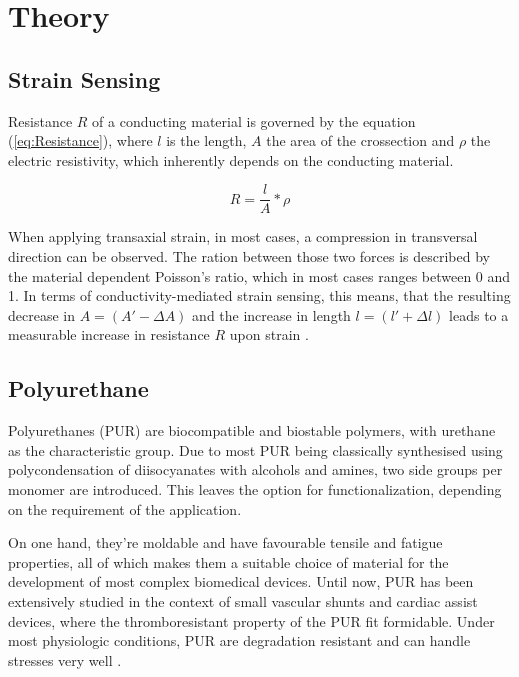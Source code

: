 \section{Theory}
\label{sec:Theory}

\subsection{Strain Sensing}
Resistance $R$ of a conducting material is governed by the equation (\ref{eq:Resistance}), where $l$ is the length, $A$ the area of the crossection and $\rho$ the electric resistivity, which inherently depends on the conducting material.

\begin{equation}
\label{eq:Resistance}
    R = \frac{l}{A}*\rho
\end{equation}

When applying transaxial strain, in most cases, a compression in transversal direction can be observed. The ration between those two forces is described by the material dependent Poisson's ratio, which in most cases ranges between 0 and 1. \cite{Gercek} In terms of conductivity-mediated strain sensing, this means, that the resulting decrease in $A = (A' -\Delta A)$ and the increase in length $l= (l' +\Delta l)$ leads to a measurable increase in resistance $R$ upon strain .


\subsection{Polyurethane}

Polyurethanes (PUR) are biocompatible and biostable polymers, with urethane as 
the characteristic group. Due to most PUR being classically synthesised using 
polycondensation of diisocyanates with alcohols and amines, two side groups per 
monomer are introduced. This leaves the option for functionalization, depending on the requirement of the application. 

On one hand, they're moldable and have favourable tensile and fatigue properties, all of which makes them a suitable choice of material for the development of most complex biomedical devices. \cite{Pinchuk}
 Until now, PUR has been extensively studied in the context of small vascular shunts and cardiac assist devices, where the thromboresistant property of the PUR fit formidable. Under most physiologic conditions, PUR are degradation resistant and can handle stresses very well \cite{Ulery}.


